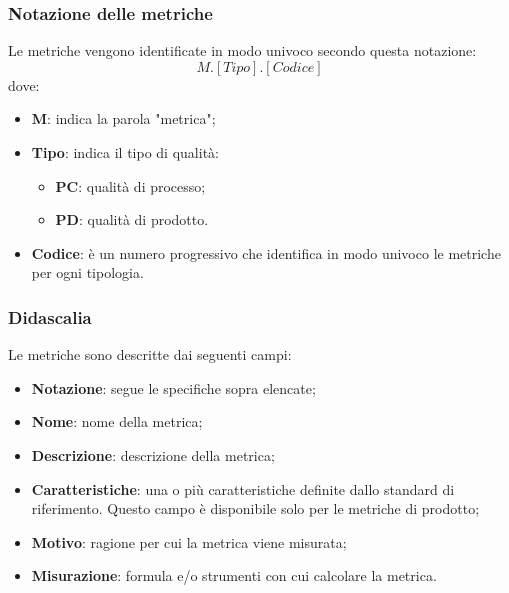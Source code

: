 \subsubsection{Notazione delle metriche}
\par Le metriche vengono identificate in modo univoco secondo questa notazione: 
\[M.[Tipo].[Codice]\]
dove: 
\begin{itemize}
    \item \textbf{M}: indica la parola "metrica";
    \item \textbf{Tipo}: indica il tipo di qualità: 
        \begin{itemize}
            \item \textbf{PC}: qualità di processo; 
            \item \textbf{PD}: qualità di prodotto.
        \end{itemize}
    \item \textbf{Codice}: è un numero progressivo che identifica in modo univoco le metriche per ogni tipologia.
\end{itemize}

\subsubsection{Didascalia}
Le metriche sono descritte dai seguenti campi:
\begin{itemize}
    \item \textbf{Notazione}: segue le specifiche sopra elencate;
    \item \textbf{Nome}: nome della metrica;
    \item \textbf{Descrizione}: descrizione della metrica;
    \item \textbf{Caratteristiche}: una o più caratteristiche definite dallo standard di riferimento. Questo campo è disponibile solo per le metriche di prodotto;
    \item \textbf{Motivo}: ragione per cui la metrica viene misurata;
    \item \textbf{Misurazione}: formula e/o strumenti con cui calcolare la metrica.
\end{itemize}

